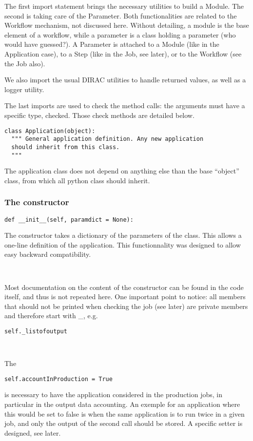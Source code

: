 \documentclass[a4paper,12pt]{article}
\begin{document}
The first import statement brings the necessary utilities to build a Module. The
second is taking care of the Parameter. Both functionalities are related to the
Workflow mechanism, not discussed here. Without detailing, a module is the base
element of a workflow, while a parameter is a class holding a parameter (who
would have guessed?). A Parameter is attached to a Module (like in the
Application case), to a Step (like in the Job, see later), or to the Workflow
(see the Job also). 

We also import the usual DIRAC utilities to handle returned values, as well as a
logger utility.

The last imports are used to check the method calls: the arguments must have a
specific type, checked. Those check methods are detailed below.

\begin{lstlisting}[name=appli]
class Application(object):
  """ General application definition. Any new application 
  should inherit from this class.
  """
\end{lstlisting}
The application class does not depend on anything else than the base ``object''
class, from which all python class should inherit.

\subsubsection{The constructor}
\begin{lstlisting}[name=appli]
  def __init__(self, paramdict = None):
\end{lstlisting}
The constructor takes a dictionary of the parameters of the class. This allows a
one-line definition of the application. This functionnality was designed to
allow easy backward compatibility.

~

Most documentation on the content of the constructor can be found in the code
itself, and thus is not repeated here. One important point to notice: all members that 
should not be printed when checking the job (see later)
are private members and therefore start with \_, e.g. 
\begin{lstlisting}[firstnumber=53,belowskip=0.5cm]
    self._listofoutput
\end{lstlisting}

~

The 
\begin{lstlisting}[firstnumber=71]
    self.accountInProduction = True    
\end{lstlisting}
is necessary to have the application considered in the production jobs, in
particular in the output data accounting. An exemple for an application where
this would be set to false is when the same application is to run twice in a
given job, and only the output of the second call should be stored. A specific
setter is designed, see later.
\end{document}
